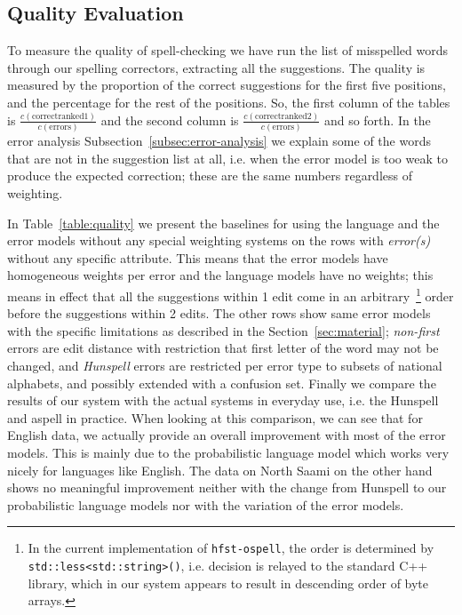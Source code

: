 \documentclass[a4paper,12pt]{article}
\begin{document}
\subsection{Quality Evaluation}
\label{subsec:quality}

To measure the quality of spell-checking we have run the list of misspelled
words through our spelling correctors, extracting all the suggestions.  The
quality is measured by the proportion of the correct suggestions for the first
five positions, and the percentage for the rest of the positions. So, the first
column of the tables is $\frac{c(\mathrm{correct ranked
1})}{c(\mathrm{errors})}$ and the second column is $\frac{c(\mathrm{correct
ranked 2})}{c(\mathrm{errors})}$ and so forth.  In the error analysis
Subsection~\ref{subsec:error-analysis} we explain some of the words that are
not in the suggestion list at all, i.e. when the error model is too weak to
produce the expected correction; these are the same numbers regardless of
weighting.

In Table~\ref{table:quality} we present the baselines for using the language
and the error models without any special weighting systems on the rows with
\emph{error(s)} without any specific attribute. This means that the error
models have homogeneous weights per error and the language models have no
weights; this means in effect that all the suggestions within 1 edit come in an
arbitrary~\footnote{In the current implementation of \texttt{hfst-ospell}, the
    order is determined by \texttt{std::less<std::string>()}, i.e. decision is
relayed to the standard C++ library, which in our system appears to result in
descending order of byte arrays.} order before the suggestions within 2 edits.
The other rows show same error models with the specific limitations as
described in the Section~\ref{sec:material}; \emph{non-first} errors are edit
distance with restriction that first letter of the word may not be changed, and
\emph{Hunspell} errors are restricted per error type to subsets of national
alphabets, and possibly extended with a confusion set.
Finally we compare the results of our system with the actual systems in
everyday use, i.e. the Hunspell and aspell in practice. When looking at this
comparison, we can see that for English data, we actually provide an overall
improvement with most of the error models.  This is mainly due to the
probabilistic language model which works very nicely for languages like
English. The data on North Saami on the other hand shows no meaningful
improvement neither with the change from Hunspell to our probabilistic language
models nor with the variation of the error models.
\end{document}
